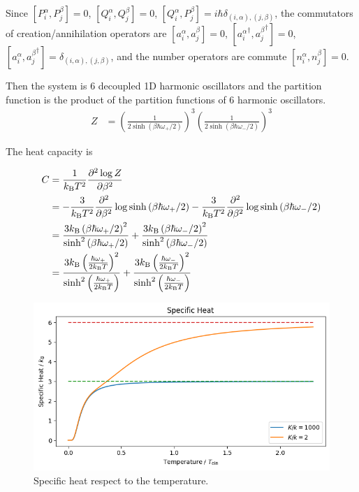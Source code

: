 \documentclass[a4paper,11pt]{article}
\begin{document}
Since $[P_i^\alpha,P_j^{\beta}] = 0$, $[Q_i^\alpha,Q_j^{\beta}] = 0$, $[Q_i^\alpha,P_j^{\beta}] = i\hbar\delta_{(i, \alpha), (j, \beta)}$, the commutators of creation/annihilation operators are $[a_i^\alpha,a_j^{\beta}] = 0$, $[{a_i^\alpha}^\dagger,{a_j^{\beta}}^\dagger] = 0$, $[a_i^\alpha,{a_j^{\beta}}^\dagger] = \delta_{(i, \alpha), (j, \beta)}$, and the number operators are commute $[n_i^\alpha, n_j^\beta] = 0$.

Then the system is 6 decoupled 1D harmonic oscillators and the partition function is the product of the partition functions of 6 harmonic oscillators.
\begin{align}
    Z
    &= \left(\frac{1}{2\sinh\left(\beta\hbar\omega_+/2\right)}\right)^3\left(\frac{1}{2\sinh\left(\beta\hbar\omega_-/2\right)}\right)^3
\end{align}

The heat capacity is

\begin{align}
    C 
    &= \frac{1}{k_{\mathrm{B}} T^2}\frac{\partial^2\log Z}{\partial \beta^2} \\
    &= -\frac{3}{k_{\mathrm{B}} T^2}\frac{\partial^2}{\partial \beta^2}\log \sinh\left(\beta\hbar\omega_+/2\right)-\frac{3}{k_{\mathrm{B}} T^2}\frac{\partial^2}{\partial \beta^2}\log \sinh\left(\beta\hbar\omega_-/2\right)\\
    &=\frac{3k_{\mathrm{B}}\left(\beta\hbar\omega_+/2\right)^2}{\sinh^2\left(\beta\hbar\omega_+/2\right)} + \frac{3k_{\mathrm{B}}\left(\beta\hbar\omega_-/2\right)^2}{\sinh^2\left(\beta\hbar\omega_-/2\right)}\\
    &=\frac{3k_{\mathrm{B}}\left(\frac{\hbar\omega_+}{2k_{\mathrm{B}} T}\right)^2}{\sinh^2\left(\frac{\hbar\omega_+}{2k_{\mathrm{B}} T}\right)} + \frac{3k_{\mathrm{B}}\left(\frac{\hbar\omega_-}{2k_{\mathrm{B}} T}\right)^2}{\sinh^2\left(\frac{\hbar\omega_-}{2k_{\mathrm{B}} T}\right)}
\end{align}

\begin{figure}[!h]
    \centering
    \includegraphics[width=0.5\linewidth]{image.png}
    \caption{Specific heat respect to the temperature.}
    \label{fig:specific-heat}
\end{figure}
\end{document}
